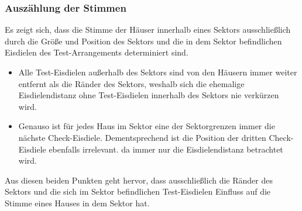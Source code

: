 \documentclass[a4paper,10pt,ngerman]{scrartcl}
\begin{document}
\subsubsection{Auszählung der Stimmen}
\label{sec:Auszählung_der_Stimmen}
Es zeigt sich, dass die Stimme der Häuser innerhalb eines Sektors ausschließlich durch die Größe und Position des Sektors und die in dem Sektor befindlichen Eisdielen des Test-Arrangements determiniert sind.
\begin{itemize}
    \item Alle Test-Eisdielen außerhalb des Sektors sind von den Häusern immer weiter entfernt als die Ränder des Sektors, weshalb sich die ehemalige Eisdielendistanz ohne Test-Eisdielen innerhalb des Sektors nie verkürzen wird.
    \item Genauso ist für jedes Haus im Sektor eine der Sektorgrenzen immer die nächste Check-Eisdiele.
          Dementsprechend ist die Position der dritten Check-Eisdiele ebenfalls irrelevant. da immer nur die Eisdielendistanz betrachtet wird.
\end{itemize}
Aus diesen beiden Punkten geht hervor, dass ausschließlich die Ränder des Sektors und die sich im Sektor befindlichen Test-Eisdielen Einfluss auf die Stimme eines Hauses in dem Sektor hat.
\end{document}
